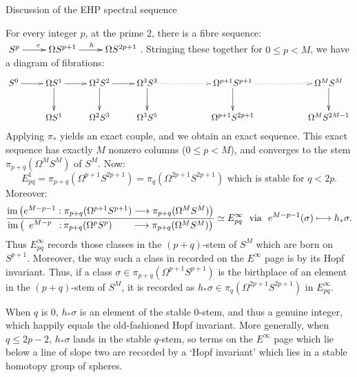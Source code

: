 \documentclass[11pt]{article}
\newcommand{\myheading}[1]
{{\noindent\Large #1}

}
\begin{document}
\myheading{Discussion of the EHP spectral sequence}
For every integer $p$, at the prime 2, there is a fibre sequence: $\xymatrix{S^p\ar[r]^e&\Omega S^{p+1}\ar[r]^h& \Omega S^{2p+1}}$. Stringing these together for $0\leq p<M$, we have a diagram of fibrations:
\[\xymatrix{
S^0\ar[r]&\Omega S^1\ar[d]\ar[r]&\Omega^2 S^2\ar[d]\ar[r]&\Omega^3 S^3\ar[d]\ar@{.>}[rr]&&\Omega^{p+1}S^{p+1}\ar[d]\ar@{.>}[rr]&&\Omega^{M}S^{M}\ar[d]\\
&\Omega S^1&\Omega^2 S^3& \Omega^3S^5&&\Omega^{p+1}S^{2p+1}&&\Omega^{M}S^{2M-1}
}\]
Applying $\pi_*$ yields an exact couple, and we obtain an exact sequence. This exact sequence has exactly $M$ nonzero columns ($0\leq p <M$), and converges to the stem $\pi_{p+q}(\Omega^{M}S^{M})$ of $S^{M}$. Now:
\[E_{pq}^1=\pi_{p+q}(\Omega^{p+1}S^{2p+1})=\pi_q(\Omega^{2p+1}S^{2p+1})\text{ which is stable for $q< 2p$}.\]
Moreover:
\[
\frac{\im\left(e^{M-p-1}:\pi_{p+q}(\Omega^{p+1}S^{p+1})\to\pi_{p+q}(\Omega^MS^M)\right)}
{\im\left(\phantom{e^{M-p-1}:}\makebox[0cm][r]{$e^{M-p}\,\ :$}
\,\makebox[0cm][l]{$\pi_{p+q}(\Omega^{p}S^{p})$}\phantom{\pi_{p+q}(\Omega^{p+1}S^{p+1})}
\to\pi_{p+q}(\Omega^MS^M)\right)}\simeq E_{pq}^\infty\text{\ \ via \ }e^{M-p-1}(\sigma)\mapsto h_*\sigma.\]%
Thus $E^\infty_{pq}$ records those classes in the $(p+q)$-stem of $S^M$ which are born on $S^{p+1}$. Moreover, the way such a class in recorded on the $E^\infty$ page is by its Hopf invariant. Thus, if a class $\sigma\in\pi_{p+q}(\Omega^{p+1}S^{p+1})$ is the birthplace of an element in the $(p+q)$-stem of $S^M$, it is recorded as $h_*\sigma\in\pi_q({\Omega^{2p+1}S^{2p+1}})$ in $E^\infty_{pq}$.

When $q$ is $0$, $h_*\sigma$ is an element of the stable $0$-stem, and thus a genuine integer, which happily equals the old-fashioned Hopf invariant. More generally, when $q\leq 2p-2$, $h_*\sigma$ lands in the stable $q$-stem, so terms on the $E^\infty$ page which lie below a line of slope two are recorded by a `Hopf invariant' which lies in a stable homotopy group of spheres.

\pagebreak
\end{document}
